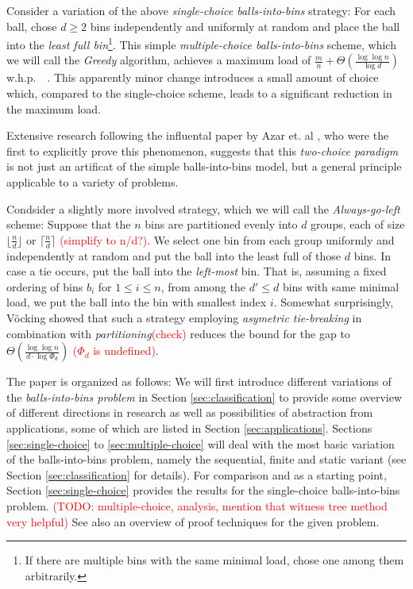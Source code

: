 \documentclass[a4paper,12pt]{article}
\newcommand\todo[1]{\textcolor{red}{(#1)}}
\begin{document}
Consider a variation of the above \emph{single-choice balls-into-bins} strategy: For each ball, chose $d \geq 2$ bins independently and uniformly at random and place the ball into the \emph{least full bin}\footnote{If there are multiple bins with the same minimal load, chose one among them arbitrarily.}. This simple \emph{multiple-choice balls-into-bins} scheme, which we will call the \emph{Greedy} algorithm, achieves a maximum load of $\frac{m}{n} + \Theta\left(\frac{\log \log n}{\log d}\right)$ w.h.p.~\cite{ABKU99}~\cite{BCSV06}. This apparently minor change introduces a small amount of choice which, compared to the single-choice scheme, leads to a significant reduction in the maximum load. 
\begin{comment}
Curiously, the exponential decrease in the gap is already achieved having just two choices (that is, $d=2$). Each additional choice decreases the bound for the maximum gap by just a constant factor~\cite{MRS01}. 
\end{comment}
Extensive research following the influental paper by Azar et. al \cite{ABKU99}, who were the first to explicitly prove this phenomenon, suggests that this \emph{two-choice paradigm} is not just an artificat of the simple balls-into-bins model, but a general principle applicable to a variety of problems. 

Condsider a slightly more involved strategy, which we will call the \emph{Always-go-left} scheme: Suppose that the $n$ bins are partitioned evenly into $d$ groups, each of size $\lfloor \frac{n}{d}\rfloor$ or $\lceil\frac{n}{d}\rceil$ \todo{simplify to n/d?}. We select one bin from each group uniformly and independently at random and put the ball into the least full of those $d$ bins. In case a tie occurs, put the ball into the \emph{left-most} bin. That is, assuming a fixed ordering of bins $b_i$ for $1 \leq i \leq n$, from among the $d' \leq d$ bins with same minimal load, we put the ball into the bin with smallest index $i$. Somewhat surprisingly, V\"ocking \cite{VOC03} showed that such a strategy employing \emph{asymetric tie-breaking} in combination with \emph{partitioning}\todo{check} reduces the bound for the gap to $\Theta \left( \frac{\log\log n}{d  \cdot \log \Phi_d}\right)$ \todo{$\Phi_d$ is undefined}.

The paper is organized as follows: We will first introduce different variations of the \emph{balls-into-bins problem} in Section \ref{sec:classification} to provide some overview of different directions in research as well as possibilities of abstraction from applications, some of which are listed in Section \ref{sec:applications}. Sections \ref{sec:single-choice} to \ref{sec:multiple-choice} will deal with the most basic variation of the balls-into-bins problem, namely the sequential, finite and static variant (see Section \ref{sec:classification} for details). For comparison and as a starting point, Section \ref{sec:single-choice} provides the results for the single-choice balls-into-bins problem. \todo{TODO: multiple-choice, analysis, mention that witness tree method very helpful}  See also \cite{MRS01} an overview of proof techniques for the given problem.  
\end{document}
